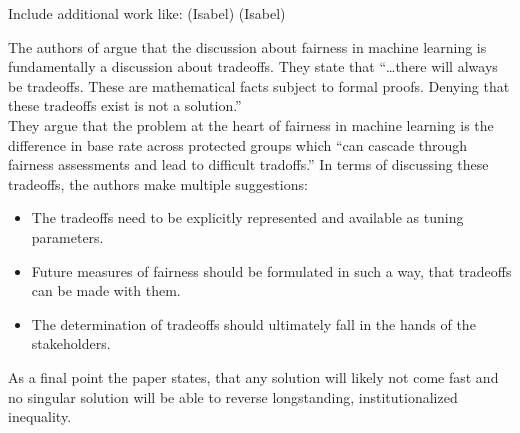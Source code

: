 Include additional work like: \cite{isabel01} (Isabel) \cite{isabel02} (Isabel) \cite{automatedDsicrimination} \cite{Singh} \cite{DBLP:conf/maics/RalescuR17}

The authors of \cite{Berk.2018} argue that the discussion about fairness in machine learning 
is fundamentally a discussion about tradeoffs. They state that \enquote{\dots there will 
always be tradeoffs. These are mathematical facts subject to formal proofs. Denying that these
tradeoffs exist is not a solution.} \\
They argue that the problem at the heart of fairness in machine learning is the difference
in base rate across protected groups which \enquote{can cascade through fairness assessments
and lead to difficult tradoffs.} In terms of discussing these tradeoffs, the authors make multiple
suggestions:
\begin{itemize}
    \item The tradeoffs need to be explicitly represented and available as tuning parameters.
    \item Future measures of fairness should be formulated in such a way, that tradeoffs can
    be made with them.
    \item The determination of tradeoffs should ultimately fall in the hands of the stakeholders.
\end{itemize}
As a final point the paper states, that any solution will likely not come fast and no singular
solution will be able to reverse longstanding, institutionalized inequality.